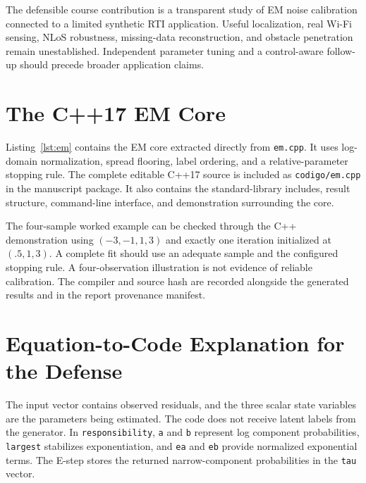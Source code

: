 \documentclass[conference,letterpaper]{IEEEtran}
\begin{document}
The defensible course contribution is a transparent study of EM noise calibration connected to a limited synthetic RTI application. Useful localization, real Wi-Fi sensing, NLoS robustness, missing-data reconstruction, and obstacle penetration remain unestablished. Independent parameter tuning and a control-aware follow-up should precede broader application claims.

\appendices
\section{The C++17 EM Core}
\label{app:code}
Listing~\ref{lst:em} contains the EM core extracted directly from \texttt{em.cpp}. It uses log-domain normalization, spread flooring, label ordering, and a relative-parameter stopping rule. The complete editable C++17 source is included as \texttt{codigo/em.cpp} in the manuscript package. It also contains the standard-library includes, result structure, command-line interface, and demonstration surrounding the core.

The four-sample worked example can be checked through the C++ demonstration using $(-3,-1,1,3)$ and exactly one iteration initialized at $(.5,1,3)$. A complete fit should use an adequate sample and the configured stopping rule. A four-observation illustration is not evidence of reliable calibration. The compiler and source hash are recorded alongside the generated results and in the report provenance manifest.

\begin{figure}[t]

\end{figure}

\section{Equation-to-Code Explanation for the Defense}
The input vector contains observed residuals, and the three scalar state variables are the parameters being estimated. The code does not receive latent labels from the generator. In \texttt{responsibility}, \texttt{a} and \texttt{b} represent log component probabilities, \texttt{largest} stabilizes exponentiation, and \texttt{ea} and \texttt{eb} provide normalized exponential terms. The E-step stores the returned narrow-component probabilities in the \texttt{tau} vector.
\end{document}
